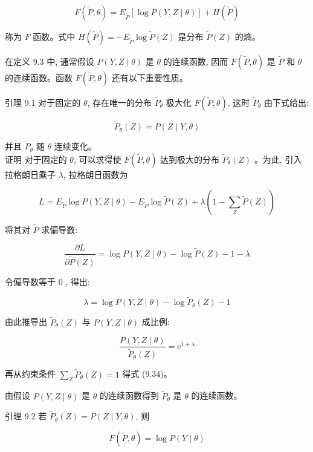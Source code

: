 \documentclass[10pt]{article}
\begin{document}
\begin{equation*}
F(\tilde{P}, \theta)=E_{\tilde{P}}[\log P(Y, Z \mid \theta)]+H(\tilde{P}) \tag{9.33}
\end{equation*}


称为 $F$ 函数。式中 $H(\tilde{P})=-E_{\tilde{P}} \log \tilde{P}(Z)$ 是分布 $\tilde{P}(Z)$ 的熵。

在定义 9.3 中, 通常假设 $P(Y, Z \mid \theta)$ 是 $\theta$ 的连续函数, 因而 $F(\tilde{P}, \theta)$ 是 $\tilde{P}$ 和 $\theta$ 的连续函数。函数 $F(\tilde{P}, \theta)$ 还有以下重要性质。

引理 9.1 对于固定的 $\theta$, 存在唯一的分布 $\tilde{P}_{\theta}$ 极大化 $F(\tilde{P}, \theta)$, 这时 $\tilde{P}_{\theta}$ 由下式给出:


\begin{equation*}
\tilde{P}_{\theta}(Z)=P(Z \mid Y, \theta) \tag{9.34}
\end{equation*}


并且 $\tilde{P}_{\theta}$ 随 $\theta$ 连续变化。\\
证明 对于固定的 $\theta$, 可以求得使 $F(\tilde{P}, \theta)$ 达到极大的分布 $\tilde{P}_{\theta}(Z)$ 。为此, 引入拉格朗日乘子 $\lambda$, 拉格朗日函数为


\begin{equation*}
L=E_{\tilde{P}} \log P(Y, Z \mid \theta)-E_{\tilde{P}} \log \tilde{P}(Z)+\lambda\left(1-\sum_{Z} \tilde{P}(Z)\right) \tag{9.35}
\end{equation*}


将其对 $\tilde{P}$ 求偏导数:

$$
\frac{\partial L}{\partial \tilde{P}(Z)}=\log P(Y, Z \mid \theta)-\log \tilde{P}(Z)-1-\lambda
$$

令偏导数等于 0 , 得出:

$$
\lambda=\log P(Y, Z \mid \theta)-\log \tilde{P}_{\theta}(Z)-1
$$

由此推导出 $\tilde{P}_{\theta}(Z)$ 与 $P(Y, Z \mid \theta)$ 成比例:

$$
\frac{P(Y, Z \mid \theta)}{\tilde{P}_{\theta}(Z)}=\mathrm{e}^{1+\lambda}
$$

再从约束条件 $\sum_{Z} \tilde{P}_{\theta}(Z)=1$ 得式 (9.34)。

由假设 $P(Y, Z \mid \theta)$ 是 $\theta$ 的连续函数得到 $\tilde{P}_{\theta}$ 是 $\theta$ 的连续函数。

引理 9.2 若 $\tilde{P}_{\theta}(Z)=P(Z \mid Y, \theta)$, 则


\begin{equation*}
F(\tilde{P}, \theta)=\log P(Y \mid \theta) \tag{9.36}
\end{equation*}
\end{document}
